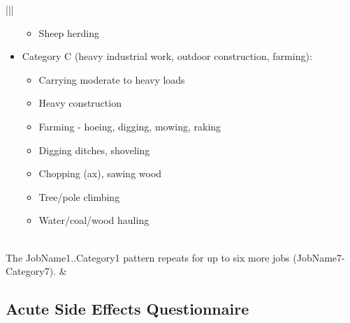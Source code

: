 \documentclass[letterpaper,10pt,english]{sphinxmanual}
\begin{document}
\begin{savenotes}
\begin{tabular}[t]{|*{2}{|}}
\begin{itemize}
\begin{itemize}
\item {} 
Sheep herding

\end{itemize}

\item {} 
Category C (heavy industrial work, outdoor construction, farming):
\begin{itemize}
\item {} 
Carrying moderate to heavy loads

\item {} 
Heavy construction

\item {} 
Farming - hoeing, digging, mowing, raking

\item {} 
Digging ditches, shoveling

\item {} 
Chopping (ax), sawing wood

\item {} 
Tree/pole climbing

\item {} 
Water/coal/wood hauling

\end{itemize}

\end{itemize}
\\
\hline
The JobName1..Category1 pattern repeats for up to six more jobs (JobName7-Category7).
&\\
\hline
\end{tabular}
\par
\sphinxattableend\end{savenotes}


\subsection{Acute Side Effects Questionnaire}
\label{\detokenize{Data_Definations_Phase1B:acute-side-effects-questionnaire}}
\end{document}
